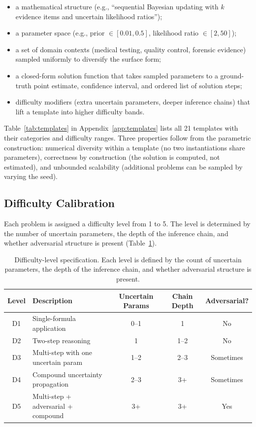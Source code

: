 \documentclass{article}
\begin{document}
\begin{itemize}[leftmargin=*,itemsep=2pt]
    \item a mathematical structure (e.g., ``sequential Bayesian updating with $k$ evidence items and uncertain likelihood ratios'');
    \item a parameter space (e.g., prior $\in [0.01, 0.5]$, likelihood ratio $\in [2, 50]$);
    \item a set of domain contexts (medical testing, quality control, forensic evidence) sampled uniformly to diversify the surface form;
    \item a closed-form solution function that takes sampled parameters to a ground-truth point estimate, confidence interval, and ordered list of solution steps;
    \item difficulty modifiers (extra uncertain parameters, deeper inference chains) that lift a template into higher difficulty bands.
\end{itemize}

Table~\ref{tab:templates} in Appendix~\ref{app:templates} lists all 21 templates with their categories and difficulty ranges. Three properties follow from the parametric construction: numerical diversity within a template (no two instantiations share parameters), correctness by construction (the solution is computed, not estimated), and unbounded scalability (additional problems can be sampled by varying the seed).

\subsection{Difficulty Calibration}
\label{sec:difficulty}

Each problem is assigned a difficulty level from 1 to 5. The level is determined by the number of uncertain parameters, the depth of the inference chain, and whether adversarial structure is present (Table~\ref{tab:difficulty_spec}).

\begin{table}[h]
\centering
\caption{Difficulty-level specification. Each level is defined by the count of uncertain parameters, the depth of the inference chain, and whether adversarial structure is present.}
\label{tab:difficulty_spec}
\begin{tabular}{clccc}
\toprule
\textbf{Level} & \textbf{Description} & \textbf{Uncertain Params} & \textbf{Chain Depth} & \textbf{Adversarial?} \\
\midrule
D1 & Single-formula application & 0--1 & 1 & No \\
D2 & Two-step reasoning & 1 & 1--2 & No \\
D3 & Multi-step with one uncertain param & 1--2 & 2--3 & Sometimes \\
D4 & Compound uncertainty propagation & 2--3 & 3+ & Sometimes \\
D5 & Multi-step + adversarial + compound & 3+ & 3+ & Yes \\
\bottomrule
\end{tabular}
\end{table}
\end{document}
